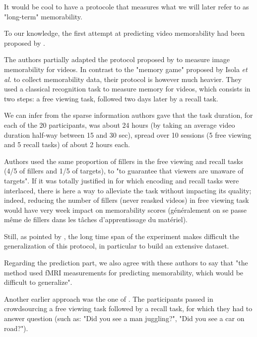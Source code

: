 \documentclass[sigconf]{acmart}
\begin{document}
It would be cool to have a protocole that measures what we will later refer to as "long-term" memorability.


To our knowledge, the first attempt at predicting video memorability had been proposed by \cite{han_2015_learning}. 


The authors partially adapted the protocol proposed by \cite{isola_2011_makes} to measure image memorability for videos.
In contrast to the "memory game" proposed by Isola \textit{et al.} to collect memorability data, their protocol is however much heavier. 
They used a classical recognition task to measure memory for videos, which consists in two steps: a free viewing task, followed two days later by a recall task.

We can infer from the sparse information authors gave that the task duration, for each of the 20 participants, was about 24 hours (by taking an average video duration half-way between 15 and 30 sec), spread over 10 sessions (5 free viewing and 5 recall tasks) of about 2 hours each.

Authors used the same proportion of fillers in the free viewing and recall tasks (4/5 of fillers and 1/5 of targets), to "to guarantee that viewers are unaware of targets". If it was totally justified in \cite{isola_2011_makes} for which encoding and recall tasks were interlaced, there is here a way to alleviate the task without impacting its quality; indeed, reducing the number of fillers (never reasked videos) in free viewing task would have very week impact on memorability scores (généralement on se passe même de fillers dans les tâches d'apprentissage du matériel).

Still, as pointed by \cite{shekhar_2017_show}, the long time span of the experiment makes difficult the generalization of this protocol, in particular to build an extensive dataset.

Regarding the prediction part, we also agree with these authors to say that "the method used fMRI measurements for predicting memorability, which would be difficult to generalize".


Another earlier approach was the one of \cite{shekhar_2017_show}.
The participants passed in crowdsourcing a free viewing task followed by a recall task, for which they had to answer question (such as: "Did you see a man juggling?", "Did you see a car on road?").
\end{document}
